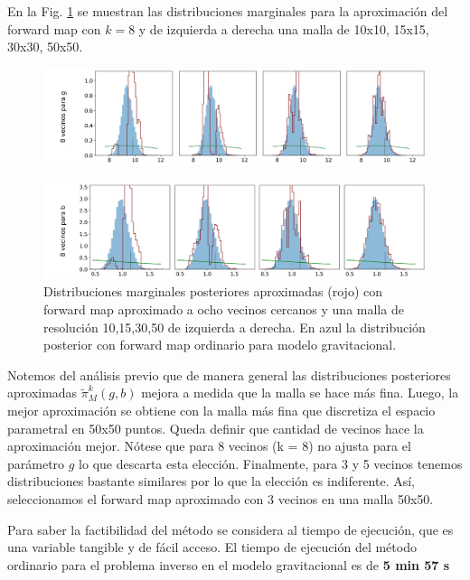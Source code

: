 En la Fig. \ref{Fig. Aprox grav 8v} se muestran las distribuciones marginales para la aproximación del forward map con $k = 8$ y de izquierda a derecha una malla de 10x10, 15x15, 30x30, 50x50.

\begin{figure}[H] 
    \centering 
    \includegraphics[width = 16 cm ]{img/Exp_Central_gravedad_Sigma/Figuras/Generales/Convergencia_theta1_3_gravedad_sigma.png} 
\end{figure} 
\begin{figure}[H] 
    \centering 
    \includegraphics[width = 16 cm ]{img/Exp_Central_gravedad_Sigma/Figuras/Generales/Convergencia_theta2_3_gravedad_sigma.png} 
    \caption{Distribuciones marginales posteriores aproximadas (rojo) con forward map aproximado a ocho vecinos cercanos y una malla de resolución 10,15,30,50 de izquierda a derecha. En azul la distribución posterior con forward map ordinario para modelo gravitacional.}
    \label{Fig. Aprox grav 8v}
\end{figure} 

Notemos del análisis previo que de manera general las distribuciones posteriores aproximadas $\tilde{\pi}^{k}_M(g,b)$ mejora a medida que la malla se hace más fina. Luego, la mejor aproximación se obtiene con la malla más fina que discretiza el espacio parametral en 50x50 puntos. Queda definir que cantidad de vecinos hace la aproximación mejor. Nótese que para 8 vecinos (k = 8) no ajusta para el parámetro $g$ lo que descarta esta elección. Finalmente, para 3 y 5 vecinos tenemos distribuciones bastante similares por lo que la elección es indiferente. Así, seleccionamos el forward map aproximado con 3 vecinos en una malla 50x50.

Para saber la factibilidad del método se considera al tiempo de ejecución, que es una variable tangible y de fácil acceso. El tiempo de ejecución del método ordinario para el problema inverso en el modelo gravitacional es de \textbf{5 min 57 s}


